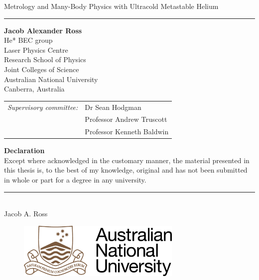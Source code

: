 \begin{flushleft}
\Large{Metrology and Many-Body Physics with Ultracold Metastable Helium\\}
\vspace{0.1cm}
\hrule
\vspace{1cm}
\large{\textbf{Jacob Alexander Ross\\}}
He* BEC group\\
Laser Physics Centre\\
Research School of Physics\\
Joint Colleges of Science\\
Australian National University\\
Canberra, Australia

\vspace{1cm}
\begin{table}[h]
\begin{tabular}{l l}
\raggedright{\emph{\large{Supervisory committee:}}} & \large{Dr Sean Hodgman}\\
                              & \large{Professor Andrew Truscott}\\
                              & \large{Professor Kenneth Baldwin}
\end{tabular}
\end{table}

\vspace{1cm}
\large{\textbf{Declaration\\}}
Except where acknowledged in the customary manner, the material presented in this thesis is, to the best of my knowledge, original and has not been submitted in whole or part for a degree in any university.\\
\end{flushleft}
\begin{flushright}
\vspace{0.5cm}
\rule{3cm}{1pt}\\
Jacob A. Ross
\end{flushright}


\mbox{}
\vfill
\begin{figure}[b]
\begin{center}
\includegraphics[width=0.7\textwidth]{fig/ANU_logo_temp}
\end{center}
\end{figure}

